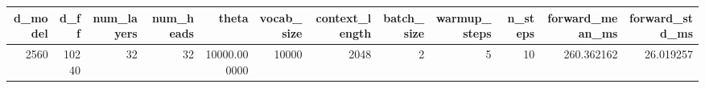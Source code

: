 \begin{tabular}{rrrrrrrrrrrr}
\toprule
d_model & d_ff & num_layers & num_heads & theta & vocab_size & context_length & batch_size & warmup_steps & n_steps & forward_mean_ms & forward_std_ms \\
\midrule
2560 & 10240 & 32 & 32 & 10000.000000 & 10000 & 2048 & 2 & 5 & 10 & 260.362162 & 26.019257 \\
\bottomrule
\end{tabular}
